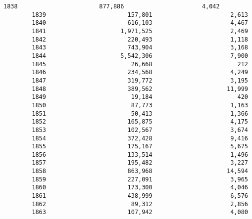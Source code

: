 \documentclass[11pt]{article}
\begin{document}
\begin{Verbatim}[commandchars=\\\{\}]
        1838                       877,886                      4,042   
        1839                       157,801                      2,613   
        1840                       616,103                      4,467   
        1841                     1,971,525                      2,469   
        1842                       220,493                      1,118   
        1843                       743,904                      3,168   
        1844                     5,542,306                      7,900   
        1845                        26,668                        212   
        1846                       234,568                      4,249   
        1847                       319,772                      3,195   
        1848                       389,562                     11,999   
        1849                        19,184                        420   
        1850                        87,773                      1,163   
        1851                        50,413                      1,366   
        1852                       165,875                      4,175   
        1853                       102,567                      3,674   
        1854                       372,428                      9,416   
        1855                       175,167                      5,675   
        1856                       133,514                      1,496   
        1857                       195,482                      3,227   
        1858                       863,968                     14,594   
        1859                       227,091                      3,965   
        1860                       173,300                      4,046   
        1861                       438,999                      6,576   
        1862                        89,312                      2,856   
        1863                       107,942                      4,080   
        

\end{Verbatim}
\end{document}

